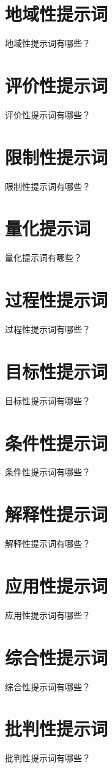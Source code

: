 \documentclass[12pt]{book}
\begin{document}
\section{地域性提示词}
地域性提示词有哪些？


\section{评价性提示词}
评价性提示词有哪些？


\section{限制性提示词}
限制性提示词有哪些？


\section{量化提示词}
量化提示词有哪些？


\section{过程性提示词}
过程性提示词有哪些？


\section{目标性提示词}
目标性提示词有哪些？


\section{条件性提示词}
条件性提示词有哪些？


\section{解释性提示词}
解释性提示词有哪些？


\section{应用性提示词}
应用性提示词有哪些？

\section{综合性提示词}
综合性提示词有哪些？


\section{批判性提示词}
批判性提示词有哪些？
\end{document}
